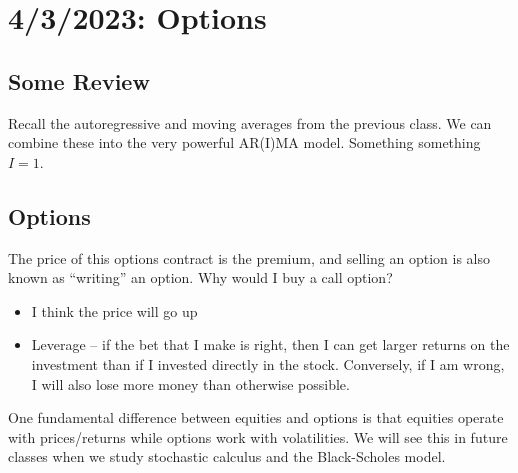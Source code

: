 \chapter{4/3/2023: Options}

\section{Some Review}
Recall the autoregressive and moving averages from the previous class. We can combine these into the very powerful AR(I)MA model. Something something $I=1$.

\section{Options}
The price of this options contract is the premium, and selling an option is also known as ``writing'' an option. Why would I buy a call option? \begin{itemize}
	\item I think the price will go up
	\item Leverage -- if the bet that I make is right, then I can get larger returns on the investment than if I invested directly in the stock. Conversely, if I am wrong, I will also lose more money than otherwise possible.
\end{itemize}

One fundamental difference between equities and options is that equities operate with prices/returns while options work with volatilities. We will see this in future classes when we study stochastic calculus and the Black-Scholes model.



